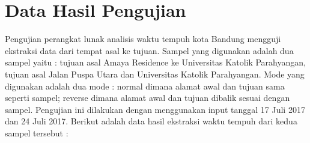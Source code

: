 \chapter{Data Hasil Pengujian}
\label{chap:datahasilpengujian}

Pengujian perangkat lunak analisis waktu tempuh kota Bandung mengguji ekstraksi data dari tempat asal ke tujuan. Sampel yang digunakan adalah dua sampel yaitu : tujuan asal Amaya Residence ke Universitas Katolik Parahyangan, tujuan asal Jalan Puspa Utara dan Universitas Katolik Parahyangan. Mode yang digunakan adalah dua mode : normal dimana alamat awal dan tujuan sama seperti sampel; reverse dimana alamat awal dan tujuan dibalik sesuai dengan sampel. Pengujian ini dilakukan dengan menggunakan input tanggal 17 Juli 2017 dan 24 Juli 2017. Berikut adalah data hasil ekstraksi waktu tempuh dari kedua sampel tersebut :

